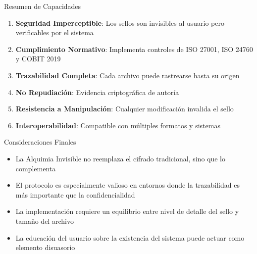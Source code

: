 \begin{caja}{Resumen de Capacidades}
\begin{enumerate}
\item \textbf{Seguridad Imperceptible}: Los sellos son invisibles al usuario pero verificables por el sistema
\item \textbf{Cumplimiento Normativo}: Implementa controles de ISO 27001, ISO 24760 y COBIT 2019
\item \textbf{Trazabilidad Completa}: Cada archivo puede rastrearse hasta su origen
\item \textbf{No Repudiación}: Evidencia criptográfica de autoría
\item \textbf{Resistencia a Manipulación}: Cualquier modificación invalida el sello
\item \textbf{Interoperabilidad}: Compatible con múltiples formatos y sistemas
\end{enumerate}
\end{caja}


\bigskip

\begin{caja}{Consideraciones Finales}
\begin{itemize}
\item La Alquimia Invisible no reemplaza el cifrado tradicional, sino que lo complementa
\item El protocolo es especialmente valioso en entornos donde la trazabilidad es más importante que la confidencialidad
\item La implementación requiere un equilibrio entre nivel de detalle del sello y tamaño del archivo
\item La educación del usuario sobre la existencia del sistema puede actuar como elemento disuasorio
\end{itemize}
\end{caja}
